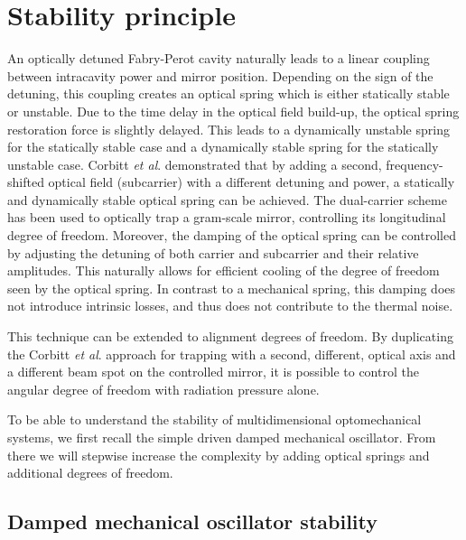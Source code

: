
\section{Stability principle}
\label{sec:II}

An optically detuned Fabry-Perot cavity naturally leads to a linear coupling between intracavity power and 
mirror position. Depending on the sign of the detuning, this coupling creates an optical spring which
is either statically stable or unstable. Due to the time delay in the optical field build-up, the optical spring 
restoration force is slightly delayed. This leads to a dynamically unstable spring for the statically stable case
and a dynamically stable spring for the statically unstable case. Corbitt \emph{et al}. \cite{Corbitt07} demonstrated that by adding a second, frequency-shifted optical field (subcarrier) with a different detuning and power, a statically and dynamically stable optical spring can be achieved. The dual-carrier scheme has been used to optically trap a gram-scale mirror, controlling its longitudinal degree of freedom.
Moreover, the damping of the optical spring can be controlled by adjusting the detuning of both carrier and subcarrier and their relative amplitudes. This naturally allows for efficient cooling of the degree of freedom seen by the optical spring. In contrast to a mechanical spring, this damping does not introduce intrinsic losses, and thus does not contribute to the thermal noise.

This technique can be extended to alignment degrees of freedom. By duplicating the Corbitt \emph{et al}. approach for trapping 
with a second, different, optical axis and a different beam spot on the controlled mirror, it is possible to control the angular 
degree of freedom with radiation pressure alone.

To be able to understand the stability of multidimensional optomechanical systems, we first recall the simple driven damped mechanical oscillator. From there we will stepwise increase the complexity by adding optical springs and additional degrees of freedom. 

\subsection{Damped mechanical oscillator stability}

